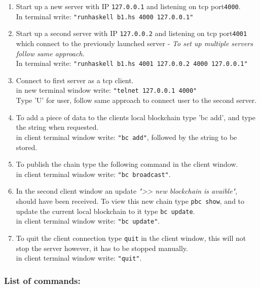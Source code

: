 \documentclass[paper=a4, fontsize=11pt]{scrartcl} %
\numberwithin{equation}{section} %
\numberwithin{figure}{section} %
\numberwithin{table}{section} %
\begin{document}
\begin{enumerate}
\item Start up a new server with IP \texttt{127.0.0.1} and listening on tcp port\texttt{4000}.\\ In terminal write:  \texttt{"runhaskell b1.hs 4000 127.0.0.1"}
\item Start up a second server with IP \texttt{127.0.0.2} and listening on tcp port\texttt{4001} which connect to the previously launched server - \textit{To set up multiple servers follow same approach.}\\In terminal write: \texttt{"runhaskell b1.hs 4001 127.0.0.2 4000 127.0.0.1"}
\item Connect to first server as a tcp client.\\ in new terminal window write: \texttt{"telnet 127.0.0.1 4000"}\\
Type 'U' for user, follow same approach to connect user to the second server.
\item To add a piece of data to the clients local blockchain type 'bc add', and type the string when requested.\\ in client terminal window write: \texttt{"bc add"}, followed by the string to be stored.
\item To publish the chain type the following command in the client window.\\
in client terminal window write: \texttt{"bc broadcast"}.
\item In the second client window an update \textit{">> new blockchain is avaible"}, should have been received. To view this new chain type \texttt{pbc show}, and to update the current local blockchain to it type \texttt{bc update}.\\
in client terminal window write: \texttt{"bc update"}.
\item To quit the client connection type \texttt{quit} in the client window, this will not stop the server however, it has to be stopped manually.\\
in client terminal window write: \texttt{"quit"}.
\end{enumerate}

\subsubsection{List of commands:}
\end{document}
